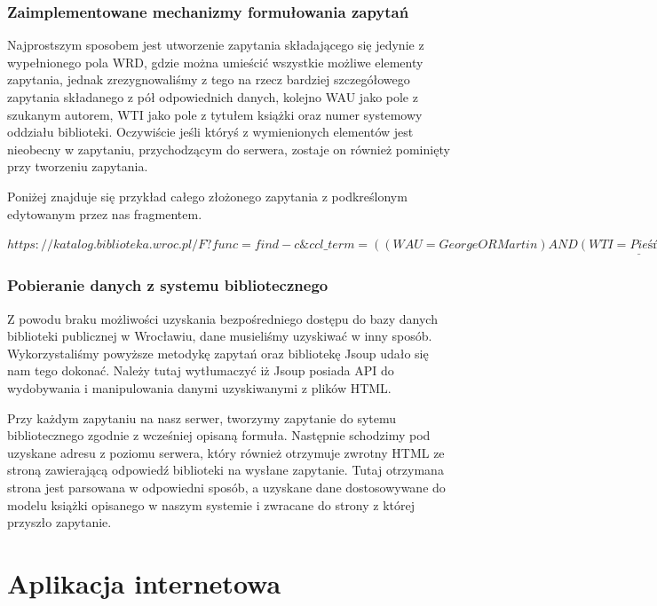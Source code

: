 \documentclass{report}
\begin{document}
			\subsubsection{Zaimplementowane mechanizmy formułowania zapytań}
				
				Najprostszym sposobem jest utworzenie zapytania składającego się jedynie z wypełnionego pola WRD, gdzie można umieścić wszystkie możliwe elementy zapytania, jednak zrezygnowaliśmy z tego na rzecz bardziej szczegółowego zapytania składanego z pół odpowiednich danych, kolejno WAU jako pole z szukanym autorem, WTI jako pole z tytułem książki oraz numer systemowy oddziału biblioteki. Oczywiście jeśli któryś z wymienionych elementów jest nieobecny w zapytaniu, przychodzącym do serwera, zostaje on również pominięty przy tworzeniu zapytania.
				
				Poniżej znajduje się przykład całego złożonego zapytania z podkreślonym edytowanym przez nas fragmentem.
				
				\begin{center}
					$ https://katalog.biblioteka.wroc.pl/F?func=find-c\&ccl\_term=\underline{((WAU=George OR Martin)AND(WTI=Pieśń?))and(WFT=(BK))\&local\_base=31} $
				\end{center}
			
			\subsubsection{Pobieranie danych z systemu bibliotecznego}
			
			Z powodu braku możliwości uzyskania bezpośredniego dostępu do bazy danych biblioteki publicznej w Wrocławiu, dane musieliśmy uzyskiwać w inny sposób. Wykorzystaliśmy powyższe metodykę zapytań oraz bibliotekę Jsoup udało się nam tego dokonać. Należy tutaj wytłumaczyć iż Jsoup posiada API do wydobywania i manipulowania danymi uzyskiwanymi z plików HTML.
			
			Przy każdym zapytaniu na nasz serwer, tworzymy zapytanie do sytemu bibliotecznego zgodnie z wcześniej opisaną formuła. Następnie schodzimy pod uzyskane adresu z poziomu serwera, który również otrzymuje zwrotny HTML ze stroną zawierającą odpowiedź biblioteki na wysłane zapytanie. Tutaj otrzymana strona jest parsowana w odpowiedni sposób, a uzyskane dane dostosowywane do modelu książki opisanego w naszym systemie i zwracane do strony z której przyszło zapytanie.
		
	\section{Aplikacja internetowa}
	
\end{document}
